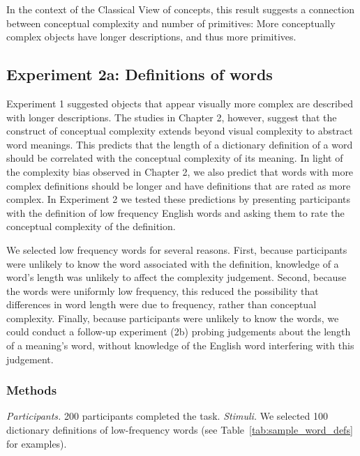 In the context of the Classical View of concepts, this result suggests a connection between conceptual complexity and number of primitives: More conceptually complex objects have longer descriptions, and thus more primitives. 

\subsection{Experiment 2a: Definitions of words}
Experiment 1 suggested objects that appear visually more complex are described with longer descriptions. The studies in Chapter 2, however, suggest that the construct of conceptual complexity extends beyond visual complexity to abstract word meanings. This predicts that the length of a dictionary definition of a word should be correlated with the conceptual complexity of its meaning. In light of the complexity bias observed in Chapter 2, we also predict that words with more complex definitions should be longer and have definitions that are rated as more complex. In Experiment 2 we tested these predictions by presenting participants with the definition of low frequency English words  and asking them to rate the conceptual complexity of the definition.

We selected low frequency words for several reasons. First, because participants were unlikely to know the word associated with the definition, knowledge of a word's length was unlikely to affect the complexity judgement. Second, because the words were uniformly low frequency, this reduced the possibility that differences in word length were due to frequency, rather than conceptual complexity. Finally, because participants were unlikely to know the words, we could conduct a follow-up experiment (2b) probing judgements about the length of a meaning's word, without knowledge of the English word interfering with this judgement.

\subsubsection{Methods}

{\it Participants.} 
200 participants completed the task.
{\it Stimuli.} 
We selected 100 dictionary definitions of low-frequency words (see Table~\ref{tab:sample_word_defs} for examples). 

